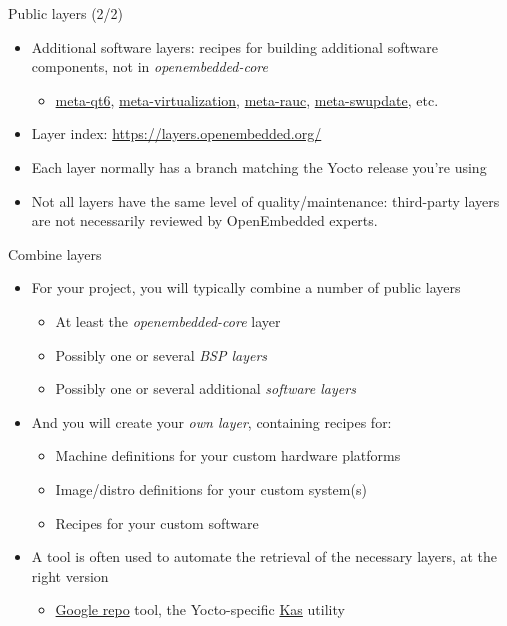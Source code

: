\begin{frame}{Public layers (2/2)}
  \begin{itemize}
  \item Additional software layers: recipes for building additional
    software components, not in {\em openembedded-core}
    \begin{itemize}
    \item
      \href{https://code.qt.io/cgit/yocto/meta-qt6.git/}{meta-qt6},
      \href{https://git.yoctoproject.org/meta-virtualization}{meta-virtualization},
      \href{https://github.com/rauc/meta-rauc}{meta-rauc},
      \href{https://github.com/sbabic/meta-swupdate}{meta-swupdate},
      etc.
    \end{itemize}
  \item Layer index: \url{https://layers.openembedded.org/}
  \item Each layer normally has a branch matching the Yocto release
    you're using
  \item Not all layers have the same level of quality/maintenance:
    third-party layers are not necessarily reviewed by OpenEmbedded
    experts.
  \end{itemize}
\end{frame}

\begin{frame}{Combine layers}
  \begin{itemize}
  \item For your project, you will typically combine a number of
    public layers
    \begin{itemize}
    \item At least the {\em openembedded-core} layer
    \item Possibly one or several {\em BSP layers}
    \item Possibly one or several additional {\em software layers}
    \end{itemize}
  \item And you will create your {\em own layer}, containing recipes
    for:
    \begin{itemize}
    \item Machine definitions for your custom hardware platforms
    \item Image/distro definitions for your custom system(s)
    \item Recipes for your custom software
    \end{itemize}
  \item A tool is often used to automate the retrieval of the
    necessary layers, at the right version
    \begin{itemize}
    \item \href{https://gerrit.googlesource.com/git-repo/}{Google
        repo} tool, the Yocto-specific
      \href{https://kas.readthedocs.io}{Kas} utility
    \end{itemize}
  \end{itemize}
\end{frame}

